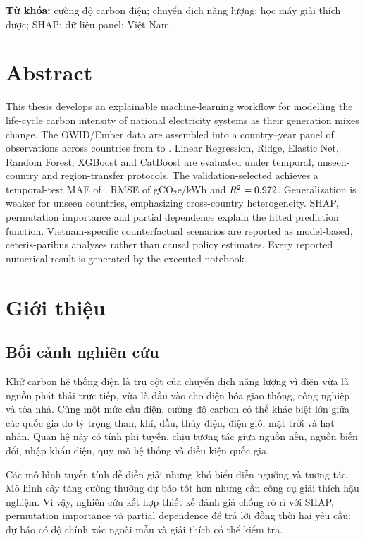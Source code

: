 \documentclass[12pt,a4paper,oneside]{report}
\begin{document}
\noindent\textbf{Từ khóa:} cường độ carbon điện; chuyển dịch năng lượng; học máy giải thích được; SHAP; dữ liệu panel; Việt Nam.

\chapter*{Abstract}
This thesis develops an explainable machine-learning workflow for modelling the life-cycle carbon intensity of national electricity systems as their generation mixes change. The OWID/Ember data are assembled into a country--year panel of \PanelRows{} observations across \PanelCountries{} countries from \PanelStartYear{} to \PanelEndYear. Linear Regression, Ridge, Elastic Net, Random Forest, XGBoost and CatBoost are evaluated under temporal, unseen-country and region-transfer protocols. The validation-selected \BestModel{} achieves a temporal-test MAE of \TemporalMAE{}, RMSE of \TemporalRMSE{} gCO$_2$e/kWh and $R^2=0.972$. Generalization is weaker for unseen countries, emphasizing cross-country heterogeneity. SHAP, permutation importance and partial dependence explain the fitted prediction function. Vietnam-specific counterfactual scenarios are reported as model-based, ceteris-paribus analyses rather than causal policy estimates. Every reported numerical result is generated by the executed notebook.

\tableofcontents
\listoffigures
\clearpage
{}

\chapter{Giới thiệu}
\section{Bối cảnh nghiên cứu}
Khử carbon hệ thống điện là trụ cột của chuyển dịch năng lượng vì điện vừa là nguồn phát thải trực tiếp, vừa là đầu vào cho điện hóa giao thông, công nghiệp và tòa nhà. Cùng một mức cầu điện, cường độ carbon có thể khác biệt lớn giữa các quốc gia do tỷ trọng than, khí, dầu, thủy điện, điện gió, mặt trời và hạt nhân. Quan hệ này có tính phi tuyến, chịu tương tác giữa nguồn nền, nguồn biến đổi, nhập khẩu điện, quy mô hệ thống và điều kiện quốc gia.

Các mô hình tuyến tính dễ diễn giải nhưng khó biểu diễn ngưỡng và tương tác. Mô hình cây tăng cường thường dự báo tốt hơn nhưng cần công cụ giải thích hậu nghiệm. Vì vậy, nghiên cứu kết hợp thiết kế đánh giá chống rò rỉ với SHAP, permutation importance và partial dependence để trả lời đồng thời hai yêu cầu: dự báo có độ chính xác ngoài mẫu và giải thích có thể kiểm tra.
\end{document}
